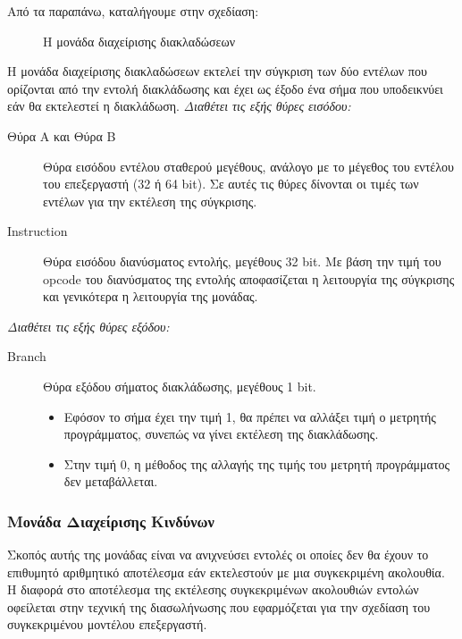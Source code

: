 \documentclass[11pt]{extarticle}
\begin{document}
Από τα παραπάνω, καταλήγουμε στην σχεδίαση:
\begin{figure}[H]
    \centering
    \caption[Μονάδα Διαχείρισης Διακλαδώσεων]{Η μονάδα διαχείρισης διακλαδώσεων}
\end{figure}
Η μονάδα διαχείρισης διακλαδώσεων εκτελεί την σύγκριση των δύο εντέλων που ορίζονται από την εντολή διακλάδωσης και έχει ως έξοδο ένα σήμα που υποδεικνύει εάν θα εκτελεστεί η διακλάδωση.
\vspace{1em}
\newpage
\textit{Διαθέτει τις εξής θύρες εισόδου:}
\begin{description}
 \item[Θύρα A και Θύρα B] Θύρα εισόδου εντέλου σταθερού μεγέθους, ανάλογο με το μέγεθος του εντέλου του επεξεργαστή (32 ή 64 bit). \newline
 Σε αυτές τις θύρες δίνονται οι τιμές των εντέλων για την εκτέλεση της σύγκρισης.
 \item[Instruction] Θύρα εισόδου διανύσματος εντολής, μεγέθους 32 bit. \newline
 Με βάση την τιμή του opcode του διανύσματος της εντολής αποφασίζεται η λειτουργία της σύγκρισης και γενικότερα η λειτουργία της μονάδας.
\end{description}
\textit{Διαθέτει τις εξής θύρες εξόδου:}
\begin{description}
 \item[Branch] Θύρα εξόδου σήματος διακλάδωσης, μεγέθους 1 bit.
 \begin{itemize}
     \item Εφόσον το σήμα έχει την τιμή 1, θα πρέπει να αλλάξει τιμή ο μετρητής προγράμματος, συνεπώς να γίνει εκτέλεση της διακλάδωσης.
     \item Στην τιμή 0, η μέθοδος της αλλαγής της τιμής του μετρητή προγράμματος δεν μεταβάλλεται.
 \end{itemize} 
\end{description}

\subsubsection{Μονάδα Διαχείρισης Κινδύνων}
Σκοπός αυτής της μονάδας είναι να ανιχνεύσει εντολές οι οποίες δεν θα έχουν το επιθυμητό αριθμητικό αποτέλεσμα εάν εκτελεστούν με μια συγκεκριμένη ακολουθία.
Η διαφορά στο αποτέλεσμα της εκτέλεσης συγκεκριμένων ακολουθιών εντολών οφείλεται στην τεχνική της διασωλήνωσης που εφαρμόζεται για την σχεδίαση του συγκεκριμένου μοντέλου επεξεργαστή.
\end{document}
